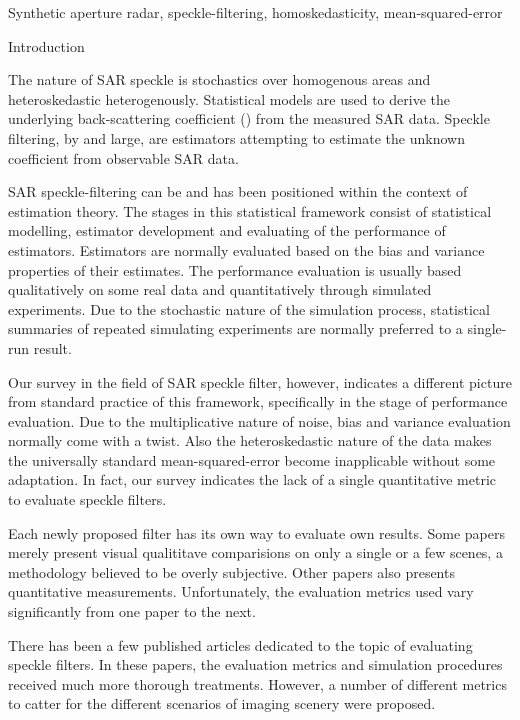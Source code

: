 Synthetic aperture radar, speckle-filtering, homoskedasticity, mean-squared-error






Introduction


The nature of SAR speckle is stochastics over homogenous areas and heteroskedastic heterogenously. 
Statistical models are used to derive the underlying back-scattering coefficient () from the measured SAR data. 
Speckle filtering, by and large, are estimators attempting to estimate the unknown coefficient from observable SAR data. 

SAR speckle-filtering can be and has been positioned within the context of estimation theory. 
The stages in this statistical framework consist of statistical modelling, estimator development and evaluating of the performance of estimators. 
Estimators are normally evaluated based on the bias and variance properties of their estimates. 
The performance evaluation is usually based qualitatively on some real data and quantitatively through simulated experiments. 
Due to the stochastic nature of the simulation process, statistical summaries of repeated simulating experiments are normally preferred to a single-run result.


Our survey in the field of SAR speckle filter, however, indicates a different picture from standard practice of this framework, specifically in the stage of performance evaluation.
Due to the multiplicative nature of noise, bias and variance evaluation normally come with a twist.
Also the heteroskedastic nature of the data makes the universally standard mean-squared-error become inapplicable without some adaptation.
In fact, our survey indicates the lack of a single quantitative metric to evaluate speckle filters.

Each newly proposed filter has its own way to evaluate own results.
Some papers merely present visual qualititave comparisions on only a single or a few scenes, a methodology believed to be overly subjective.
Other papers also presents quantitative measurements. 
Unfortunately, the evaluation metrics used vary significantly from one paper to the next.

There has been a few published articles dedicated to the topic of evaluating speckle filters.
In these papers, the evaluation metrics and simulation procedures received much more thorough treatments.
However, a number of different metrics to catter for the different scenarios of imaging scenery were proposed. 

